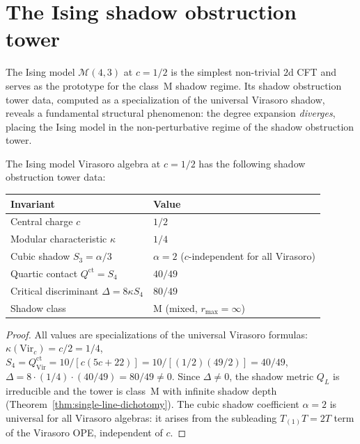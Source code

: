 \section{The Ising shadow obstruction tower}%
\label{sec:ising-shadow-tower}

The Ising model $\mathcal{M}(4,3)$ at $c = 1/2$ is the simplest
non-trivial $2$d CFT and serves as the prototype for the class~M
shadow regime. Its shadow obstruction tower data, computed as a specialization
of the universal Virasoro shadow, reveals a fundamental structural
phenomenon: the degree expansion \emph{diverges}, placing the Ising
model in the non-perturbative regime of the shadow obstruction tower.

\begin{proposition}%
\label{prop:ising-shadow-invariants}
The Ising model Virasoro algebra at $c = 1/2$ has the following
shadow obstruction tower data:
\begin{center}
\renewcommand{\arraystretch}{1.3}
\begin{tabular}{ll}
\toprule
Invariant & Value \\
\midrule
Central charge $c$ & $1/2$ \\
Modular characteristic $\kappa$ & $1/4$ \\
Cubic shadow $S_3 = \alpha/3$ & $\alpha = 2$ \textup{(}$c$-independent for all Virasoro\textup{)} \\
Quartic contact $Q^{\mathrm{ct}} = S_4$ & $40/49$ \\
Critical discriminant $\Delta = 8\kappa S_4$ & $80/49$ \\
Shadow class & M \textup{(}mixed, $r_{\max} = \infty$\textup{)} \\
\bottomrule
\end{tabular}
\end{center}
\end{proposition}

\begin{proof}
All values are specializations of the universal Virasoro formulas:
$\kappa(\mathrm{Vir}_c) = c/2 = 1/4$,
$S_4 = Q^{\mathrm{ct}}_{\mathrm{Vir}} = 10/[c(5c+22)] = 10/[(1/2)(49/2)] = 40/49$,
$\Delta = 8 \cdot (1/4) \cdot (40/49) = 80/49 \neq 0$.
Since $\Delta \neq 0$, the shadow metric $Q_L$ is irreducible
and the tower is class~M with infinite shadow depth
(Theorem~\ref{thm:single-line-dichotomy}).
The cubic shadow coefficient $\alpha = 2$ is universal for all
Virasoro algebras: it arises from the subleading $T_{(1)}T = 2T$
term of the Virasoro OPE, independent of $c$.
\end{proof}


